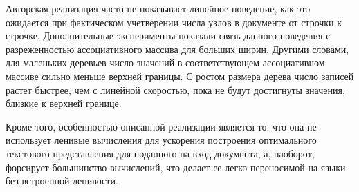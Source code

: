Авторская реализация часто не показывает линейное поведение, как это ожидается при фактическом
учетверении числа узлов в документе от строчки к строчке. Дополнительные эксперименты показали
связь данного поведения с разреженностью ассоциативного массива для больших ширин.
Другими словами, для маленьких деревьев число значений в соответствующем ассоциативном массиве
сильно меньше верхней границы. С ростом размера дерева число записей растет быстрее, чем
с линейной скоростью, пока не будут достигнуты значения, близкие к верхней границе.

Кроме того, особенностью описанной реализации является то, что она не использует 
ленивые вычисления для ускорения построения оптимального текстового представления для
поданного на вход документа, а, наоборот,
форсирует большинство вычислений, что делает ее легко переносимой на языки
без встроенной ленивости.




